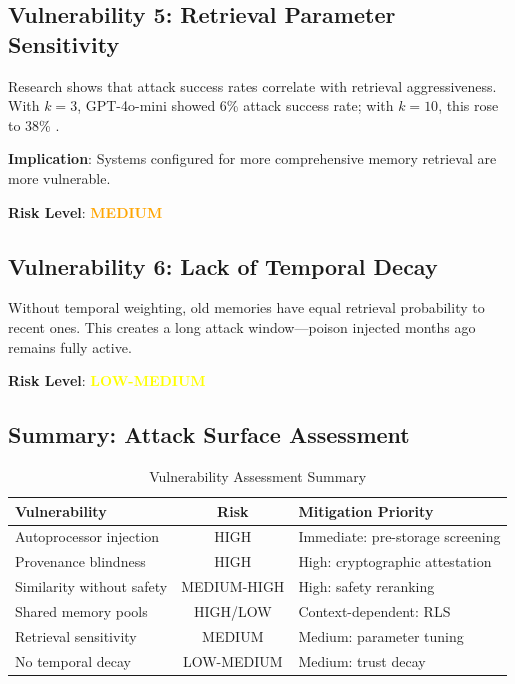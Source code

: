 \subsection{Vulnerability 5: Retrieval Parameter Sensitivity}

Research shows that attack success rates correlate with retrieval aggressiveness. With $k=3$, GPT-4o-mini showed 6\% attack success rate; with $k=10$, this rose to 38\% \cite{memorypoisoning2025}.

\textbf{Implication}: Systems configured for more comprehensive memory retrieval are more vulnerable.

\textbf{Risk Level}: \textcolor{orange}{\textbf{MEDIUM}}

\subsection{Vulnerability 6: Lack of Temporal Decay}

Without temporal weighting, old memories have equal retrieval probability to recent ones. This creates a long attack window---poison injected months ago remains fully active.

\textbf{Risk Level}: \textcolor{yellow}{\textbf{LOW-MEDIUM}}

\subsection{Summary: Attack Surface Assessment}

\begin{table}[h]
\centering
\caption{Vulnerability Assessment Summary}
\begin{tabular}{lcp{6cm}}
\toprule
\textbf{Vulnerability} & \textbf{Risk} & \textbf{Mitigation Priority} \\
\midrule
Autoprocessor injection & HIGH & Immediate: pre-storage screening \\
Provenance blindness & HIGH & High: cryptographic attestation \\
Similarity without safety & MEDIUM-HIGH & High: safety reranking \\
Shared memory pools & HIGH/LOW & Context-dependent: RLS \\
Retrieval sensitivity & MEDIUM & Medium: parameter tuning \\
No temporal decay & LOW-MEDIUM & Medium: trust decay \\
\bottomrule
\end{tabular}
\label{tab:vulnerability-summary}
\end{table}
